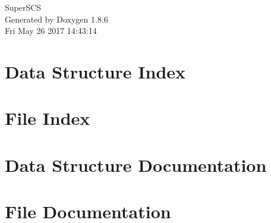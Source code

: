 \documentclass[twoside]{book}
\newcommand{\clearemptydoublepage}{%
  \newpage{\pagestyle{empty}\cleardoublepage}%
}
\begin{document}
\hypersetup{pageanchor=false}
\begin{titlepage}
\vspace*{7cm}
\begin{center}%
{\Large Super\-S\-C\-S }\\
\vspace*{1cm}
{\large Generated by Doxygen 1.8.6}\\
\vspace*{0.5cm}
{\small Fri May 26 2017 14:43:14}\\
\end{center}
\end{titlepage}
\clearemptydoublepage
\tableofcontents
\clearemptydoublepage
{}
\hypersetup{pageanchor=true}

\chapter{Data Structure Index}

\chapter{File Index}

\chapter{Data Structure Documentation}












\chapter{File Documentation}





















\newpage
{}
{}
\printindex
\end{document}
